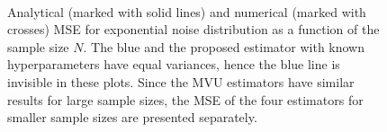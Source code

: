 \documentclass{article}
\begin{document}
\begin{figure}[ht]
	\centering
	\begin{minipage}[t]{1\linewidth}
	\centering
{}
\hfil
{}
\caption{Analytical (marked with solid lines) and numerical (marked with crosses) MSE for exponential noise distribution as a function of the sample size $N$.  The blue and the proposed estimator with known hyperparameters have equal variances, hence the blue line is invisible in these plots. Since the MVU estimators have similar results for large sample sizes, the MSE of the four estimators for smaller sample sizes are presented separately.}
\label{fig:exponential_blue_mvu}
	\end{minipage}%
	\\%
	\begin{minipage}[t]{1\linewidth}
	\centering
{}
\end{minipage}
\end{figure}
\end{document}

